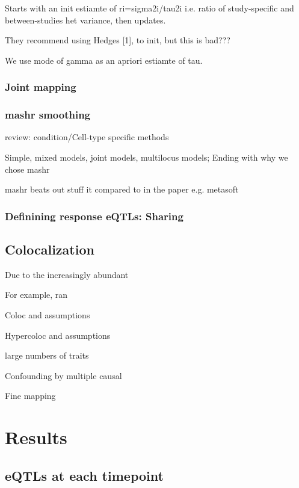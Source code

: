 Starts with an init estiamte of ri=sigma2i/tau2i i.e. ratio of study-specific and between-studies het variance, then updates.

They recommend using Hedges [1], to init, but this is bad???

We use mode of gamma as an apriori estiamte of tau.

\subsubsection{Joint mapping}

\subsubsection{mashr smoothing}

review: condition/Cell-type specific methods

Simple, mixed models, joint models, multilocus models; Ending with why we chose mashr

mashr beats out stuff it compared to in the paper e.g. metasoft

\subsubsection{Definining response eQTLs: Sharing}

\subsection{Colocalization}



Due to the increasingly abundant

For example, ran 

Coloc and assumptions

Hypercoloc and assumptions

large numbers of traits

Confounding by multiple causal

Fine mapping

\section{Results}

\subsection{eQTLs at each timepoint}


